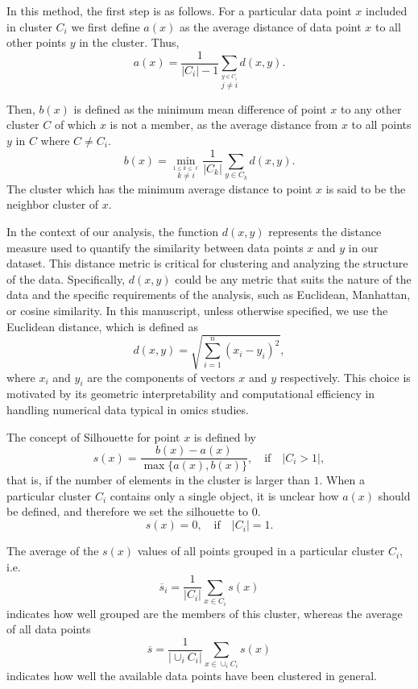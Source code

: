 In this method, the first step is as follows. For a particular data point \(x\) included in cluster \(C_{i}\) we first define \(a(x)\) as the average distance of data point \(x\) to all other points \(y\) in the cluster. Thus,
\[
a(x) = \frac{1}{|C_{i}| - 1}\sum_{\stackrel{y \in C_{i}}{j\neq i}}d(x,y).
\]

Then, \(b(x)\) is defined as the minimum mean difference of point \(x\) to any other cluster \(C\) of which \(x\) is not a member, as the average distance from \(x\) to all points \(y\) in \(C\) where \(C \neq C_{i}\).
\[
b(x) = \min_{\stackrel{1 \le k \le \ell}{k \neq i}}\frac{1}{|C_{k}|}\sum_{y \in C_{k}}d(x,y).
\]
The cluster which has the minimum average distance to point \(x\) is said to be the neighbor cluster of \(x\).

In the context of our analysis, the function \(d(x, y)\) represents the distance measure used to quantify the similarity between data points \(x\) and \(y\) in our dataset. This distance metric is critical for clustering and analyzing the structure of the data. Specifically, \(d(x, y)\) could be any metric that suits the nature of the data and the specific requirements of the analysis, such as Euclidean, Manhattan, or cosine similarity. In this manuscript, unless otherwise specified, we use the Euclidean distance, which is defined as
\[
d(x, y) = \sqrt{\sum_{i=1}^n (x_i - y_i)^2},
\]
where \(x_i\) and \(y_i\) are the components of vectors \(x\) and \(y\) respectively. This choice is motivated by its geometric interpretability and computational efficiency in handling numerical data typical in omics studies.

The concept of Silhouette for point \(x\) is defined by \[s(x) = \frac{b(x) - a(x)}{\max\{a(x),b(x)\}}, \quad \textrm{if} \quad |C_{i} > 1|,\] that is, if the number of elements in the cluster is larger than \(1\).
When a particular cluster \(C_{i}\) contains only a single object, it is unclear how \(a(x)\) should be defined, and therefore we set the silhouette to \(0\).
\[
s(x) = 0, \quad \textrm{if} \quad |C_{i}| = 1.
\]

The average of the \(s(x)\) values of all points grouped in a particular cluster \(C_{i},\) i.e.
\[
\overline{s}_i = \frac{1}{|C_i|}\sum_{x \in C_i}s(x)
\]
indicates how well grouped are the members of this cluster, whereas the average
of all data points
\[
\overline{s} = \frac{1}{|\cup_i C_i|}\sum_{x \in \cup_i C_i}s(x)
\]
indicates how well the available data points have been clustered in general.

